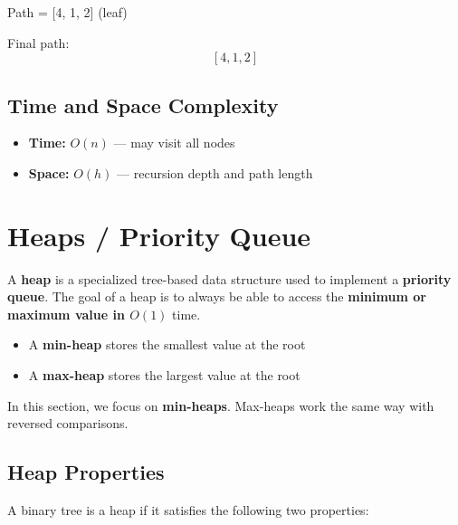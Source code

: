 \documentclass{article}
\begin{document}
\begin{center}

{\small Path = [4, 1, 2] (leaf)}
\end{center}

Final path:
\[
[4, 1, 2]
\]

\subsection{Time and Space Complexity}
\begin{itemize}
  \item \textbf{Time:} $O(n)$ — may visit all nodes
  \item \textbf{Space:} $O(h)$ — recursion depth and path length
\end{itemize}
\section{Heaps / Priority Queue}

A \textbf{heap} is a specialized tree-based data structure used to implement a \textbf{priority queue}.  
The goal of a heap is to always be able to access the \textbf{minimum or maximum value in $O(1)$} time.

\begin{itemize}
  \item A \textbf{min-heap} stores the smallest value at the root
  \item A \textbf{max-heap} stores the largest value at the root
\end{itemize}

In this section, we focus on \textbf{min-heaps}. Max-heaps work the same way with reversed comparisons.

\subsection{Heap Properties}

A binary tree is a heap if it satisfies the following two properties:
\end{document}
